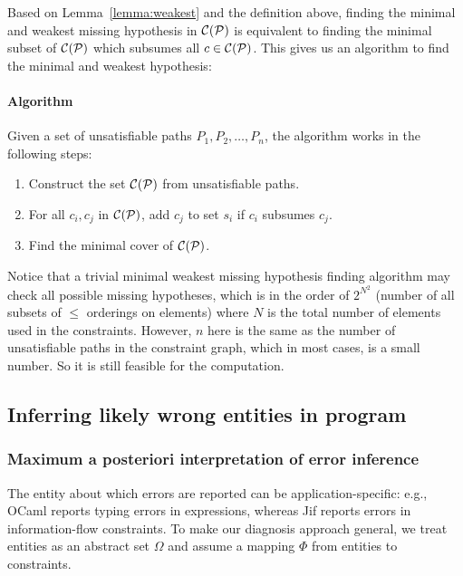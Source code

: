 Based on Lemma~\ref{lemma:weakest} and the definition above, finding
the minimal and weakest missing hypothesis in $\mathcal{C}(\mathcal{P})$ is
equivalent to finding the minimal subset of $\mathcal{C}(\mathcal{P})$ which
subsumes all $c\in \mathcal{C}(\mathcal{P})$. This gives us an algorithm to
find the minimal and weakest hypothesis:

\paragraph{Algorithm}

Given a set of unsatisfiable paths $P_1, P_2, \dots, P_n$, the
algorithm works in the following steps:

\begin{enumerate}
\item Construct the set $\mathcal{C}(\mathcal{P})$ from unsatisfiable paths.

\item For all $c_i, c_j$ in $\mathcal{C}(\mathcal{P})$, add $c_j$
to set $s_i$ if $c_i$ subsumes $c_j$.

\item Find the minimal cover of $\mathcal{C}(\mathcal{P})$.
\end{enumerate}

Notice that a trivial minimal weakest missing hypothesis finding
algorithm may check all possible missing hypotheses, which is in the
order of $2^{N^2}$ (number of all subsets of $\leq$ orderings on
elements) where $N$ is the total number of elements used in the
constraints. However, $n$ here is the same as the number of
unsatisfiable paths in the constraint graph, which in most cases, is a
small number. So it is still feasible for the computation.


\subsection{Inferring likely wrong entities in program}
\label{sec:mapmodel}

\subsubsection{Maximum a posteriori interpretation of error inference}

The entity about which errors are reported can be application-specific: e.g., 
OCaml reports typing errors in expressions, whereas
Jif reports errors in information-flow
constraints. To make our diagnosis approach general, we treat
entities as an abstract set $\Omega$ and assume a mapping
$\Phi$ from entities to constraints.

